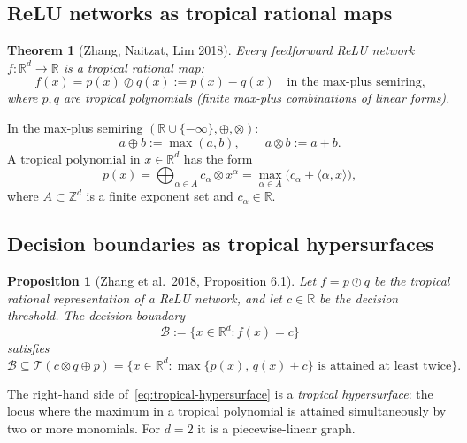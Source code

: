 \documentclass[11pt]{article}
\newtheorem{theorem}{Theorem}
\newtheorem{proposition}{Proposition}
\newcommand{\R}{\mathbb{R}}
\newcommand{\Z}{\mathbb{Z}}
\begin{document}
\subsection{ReLU networks as tropical rational maps}

\begin{theorem}[Zhang, Naitzat, Lim 2018]
Every feedforward ReLU network $f : \R^d \to \R$ is a tropical rational map:
\begin{equation}
f(x) = p(x) \oslash q(x)
:= p(x) - q(x)
\quad \text{in the max-plus semiring,}
\label{eq:tropical-rational}
\end{equation}
where $p, q$ are tropical polynomials (finite max-plus combinations of linear forms).
\end{theorem}

In the max-plus semiring $(\R \cup \{-\infty\}, \oplus, \otimes)$:
\begin{equation}
a \oplus b := \max(a,b), \qquad a \otimes b := a + b.
\end{equation}
A tropical polynomial in $x \in \R^d$ has the form
\begin{equation}
p(x) = \bigoplus_{\alpha \in A} c_\alpha \otimes x^\alpha
= \max_{\alpha \in A} \bigl(c_\alpha + \langle \alpha, x \rangle\bigr),
\end{equation}
where $A \subset \Z^d$ is a finite exponent set and $c_\alpha \in \R$.

\subsection{Decision boundaries as tropical hypersurfaces}

\begin{proposition}[Zhang et al.\ 2018, Proposition 6.1]
Let $f = p \oslash q$ be the tropical rational representation of a ReLU network, and
let $c \in \R$ be the decision threshold. The decision boundary
\begin{equation}
\mathcal{B} := \{x \in \R^d : f(x) = c\}
\end{equation}
satisfies
\begin{equation}
\mathcal{B} \subseteq \mathcal{T}\!\left(c \otimes q \oplus p\right)
= \bigl\{x \in \R^d :
\max\{p(x),\, q(x) + c\} \text{ is attained at least twice}\bigr\}.
\label{eq:tropical-hypersurface}
\end{equation}
\end{proposition}

The right-hand side of~\eqref{eq:tropical-hypersurface} is a \emph{tropical
hypersurface}: the locus where the maximum in a tropical polynomial is attained
simultaneously by two or more monomials. For $d = 2$ it is a piecewise-linear graph.
\end{document}
